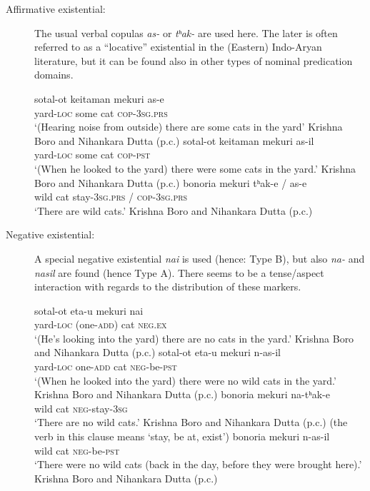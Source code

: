 \documentclass[output=paper,colorlinks,citecolor=brown]{langscibook}
\begin{document}
\begin{paperappendix}
\begin{unindented}
\begin{description}
\item[Affirmative existential:] The usual verbal copulas \textit{as-} or \textit{tʰak-} are used here. The later is often referred to as a “locative” existential in the (Eastern) Indo-Aryan literature, but it can be found also in other types of nominal predication domains.

\begin{exe}\ex \gll sotal-ot keitaman mekuri as-e \\
yard-\textsc{loc}  some cat \textsc{cop-3sg.prs} \\
    \glt `(Hearing noise from outside) there are some cats in the yard' Krishna Boro and Nihankara Dutta (p.c.)
\ex \gll sotal-ot keitaman mekuri as-il \\
yard-\textsc{loc} some cat \textsc{cop-pst} \\
    \glt `(When he looked to the yard) there were some cats in the yard.' Krishna Boro and Nihankara Dutta (p.c.)
\ex \gll bonoria mekuri tʰak-e / as-e \\
wild cat stay-\textsc{3sg.prs} / \textsc{cop-3sg.prs} \\
    \glt `There are wild cats.' Krishna Boro and Nihankara Dutta (p.c.)
    \end{exe}

\item[Negative existential:] A special negative existential \textit{nai} is used
(hence: Type B), but also \textit{na-} and \textit{nasil} are found (hence
Type A). There seems to be a tense\slash aspect interaction with regards to the distribution of these markers.
%
\begin{exe}\ex \gll sotal-ot {\op}eta-u{\cp} mekuri nai \\
yard-\textsc{loc} (one-\textsc{add}) cat \textsc{neg.ex} \\
    \glt `(He's looking into the yard) there are no cats in the yard.' Krishna Boro and Nihankara Dutta (p.c.)
\ex \gll sotal-ot {\op}eta-u{\cp} mekuri  n-as-il \\
yard-\textsc{loc} one-\textsc{add} cat \textsc{neg}-be-\textsc{pst} \\
    \glt `(When he looked into the yard) there were no wild cats in the yard.' Krishna Boro and Nihankara Dutta (p.c.)
\ex \gll bonoria mekuri na-tʰak-e \\
wild cat \textsc{neg}-stay-\textsc{3sg} \\
    \glt `There are no wild cats.' Krishna Boro and Nihankara Dutta (p.c.) (the verb in this clause means `stay, be at, exist')
\ex \gll bonoria mekuri n-as-il \\
wild cat \textsc{neg}-be-\textsc{pst} \\
    \glt `There were no wild cats (back in the day, before they were brought here).' Krishna Boro and Nihankara Dutta (p.c.)
    \end{exe}


\end{description}
\end{unindented}
\end{paperappendix}
\end{document}

